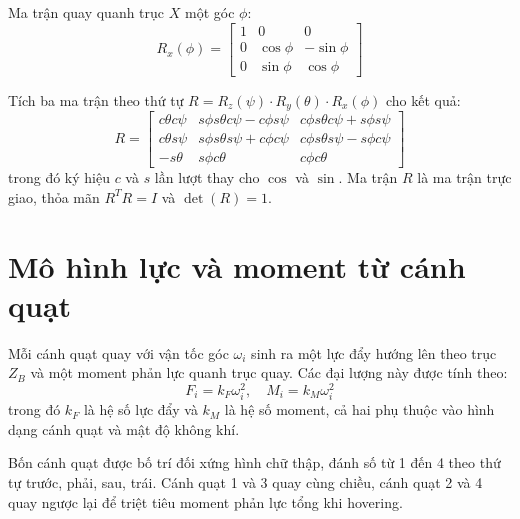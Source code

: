\documentclass[12pt,a4paper]{report}
\begin{document}
Ma trận quay quanh trục $X$ một góc $\phi$:
\begin{equation}
R_x(\phi) = \begin{bmatrix}
1 & 0        & 0         \\
0 & \cos\phi & -\sin\phi \\
0 & \sin\phi & \cos\phi
\end{bmatrix}
\end{equation}

Tích ba ma trận theo thứ tự $R = R_z(\psi) \cdot R_y(\theta) \cdot R_x(\phi)$ cho kết quả:
\begin{equation}
R = \begin{bmatrix}
c\theta c\psi & s\phi s\theta c\psi - c\phi s\psi & c\phi s\theta c\psi + s\phi s\psi \\[6pt]
c\theta s\psi & s\phi s\theta s\psi + c\phi c\psi & c\phi s\theta s\psi - s\phi c\psi \\[6pt]
-s\theta      & s\phi c\theta                     & c\phi c\theta
\end{bmatrix}
\end{equation}
trong đó ký hiệu $c$ và $s$ lần lượt thay cho $\cos$ và $\sin$. Ma trận $R$ là ma trận trực giao, thỏa mãn $R^T R = I$ và $\det(R) = 1$.

\section{Mô hình lực và moment từ cánh quạt}
Mỗi cánh quạt quay với vận tốc góc $\omega_i$ sinh ra một lực đẩy hướng lên theo trục $Z_B$ và một moment phản lực quanh trục quay. Các đại lượng này được tính theo:
\begin{equation}
F_i = k_F \omega_i^2, \quad M_i = k_M \omega_i^2
\end{equation}
trong đó $k_F$ là hệ số lực đẩy và $k_M$ là hệ số moment, cả hai phụ thuộc vào hình dạng cánh quạt và mật độ không khí.

Bốn cánh quạt được bố trí đối xứng hình chữ thập, đánh số từ 1 đến 4 theo thứ tự trước, phải, sau, trái. Cánh quạt 1 và 3 quay cùng chiều, cánh quạt 2 và 4 quay ngược lại để triệt tiêu moment phản lực tổng khi hovering.
\end{document}
